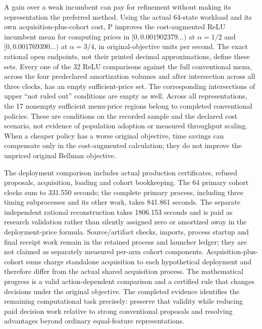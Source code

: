 A gain over a weak incumbent can pay for refinement without making its
representation the preferred method. Using the actual 64-state workload
and its own acquisition-plus-cohort cost, P improves the cost-augmented
ReLU incumbent mean for computing prices in
$[0,0.001902379\ldots)$ at $\alpha=1/2$ and
$[0,0.001769390\ldots)$ at $\alpha=3/4$, in original-objective units per
second. The exact rational open endpoints, not their printed decimal
approximations, define these sets. Every one of the 32 ReLU comparisons
against the full conventional menu, across the four predeclared amortization
volumes and after intersection across all three clocks, has an empty
sufficient-price set. The corresponding intersections of upper
``not ruled out'' conditions are empty as well. Across all representations,
the 17 nonempty sufficient menu-price regions belong to completed
conventional policies. These are conditions on the recorded sample and the
declared cost scenario, not evidence of population adoption or measured
throughput scaling. When a cheaper policy has a worse original objective,
time savings can compensate only in the cost-augmented calculation; they do
not improve the unpriced original Bellman objective.

The deployment comparison includes actual production certificates, refused
proposals, acquisition, loading and cohort bookkeeping. The 64 primary
cohort clocks sum to 331.550 seconds; the complete primary process, including
three timing subprocesses and its other work, takes 841.861 seconds.
The separate independent rational reconstruction takes 1806.153 seconds
and is paid as research validation rather than silently assigned zero or
amortized away in the deployment-price formula. Source/artifact checks,
imports, process startup and final receipt work remain in the retained
process and launcher ledger; they are not claimed as separately measured
per-arm cohort components. Acquisition-plus-cohort sums charge standalone
acquisition to each hypothetical deployment and therefore differ from
the actual shared acquisition process. The mathematical progress is a valid
action-dependent comparison and a certified rule that changes decisions
under the original objective. The completed evidence identifies the
remaining computational task precisely: preserve that validity while
reducing paid decision work relative to strong conventional proposals and
resolving advantages beyond ordinary equal-feature representations.
